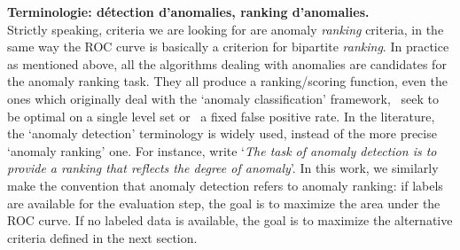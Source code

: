 \begin{remarque}{\bf Terminologie: détection d'anomalies, ranking d'anomalies.\\}
Strictly speaking, criteria we are looking for are anomaly \emph{ranking} criteria, in the same way the ROC curve is basically a criterion for bipartite \emph{ranking}.
%
In practice as mentioned above, all the algorithms dealing with anomalies are candidates for the anomaly ranking task. They all produce a ranking/scoring function, even the ones which originally deal with the `anomaly classification' framework, %
\ie~seek to be optimal on a single level set or \wrt~a fixed false positive rate.
In the literature, the `anomaly detection' terminology is widely used, instead of the more precise `anomaly ranking' one. For instance, \cite{Liu2008} write `\emph{The task of anomaly detection is to provide a ranking that reflects the degree of anomaly}'.
%
In this work, we similarly make the convention that anomaly detection refers to anomaly ranking: if labels are available for the evaluation step, the goal is to maximize the area under the ROC curve. If no labeled data is available, the goal is to maximize the alternative criteria defined in the next section.





\end{remarque}
